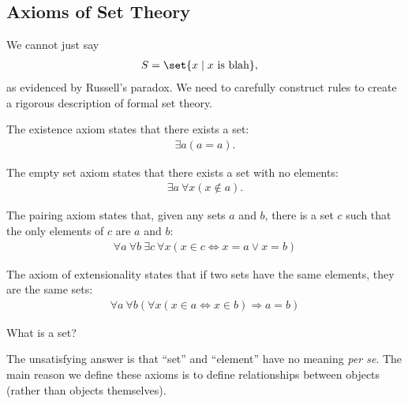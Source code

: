 \documentclass[10pt]{mypackage}
\begin{document}
\subsection{Axioms of Set Theory}%
We cannot just say
\begin{align*}
  S &= \set{x\mid x\text{ is blah}},
\end{align*}
as evidenced by Russell's paradox. We need to carefully construct rules to create a rigorous description of formal set theory.
\begin{axiom}[Existence]
  The existence axiom states that there exists a set:
  \begin{align*}
    \exists a \left(a = a\right).
  \end{align*}
\end{axiom}
\begin{axiom}
  The empty set axiom states that there exists a set with no elements:
  \begin{align*}
    \exists a\: \forall x\left(x\notin a\right).
  \end{align*}
\end{axiom}
\begin{axiom}[Pairing]
  The pairing axiom states that, given any sets $a$ and $b$, there is a set $c$ such that the only elements of $c$ are $a$ and $b$:
  \begin{align*}
    \forall a\:\forall b\:\exists c\:\forall x\left(x\in c \Leftrightarrow x = a \vee x = b\right)
  \end{align*}
\end{axiom}
\begin{axiom}[Extensionality]
  The axiom of extensionality states that if two sets have the same elements, they are the same sets:
  \begin{align*}
    \forall a\:\forall b\left(\forall x\left(x\in a\Leftrightarrow x\in b\right) \Rightarrow a = b\right)
  \end{align*}
\end{axiom}
\begin{question}
  What is a set?
\begin{answer}
  The unsatisfying answer is that ``set'' and ``element'' have no meaning \textit{per se}. The main reason we define these axioms is to define relationships between objects (rather than objects themselves).
\end{answer}
\end{question}
\end{document}
